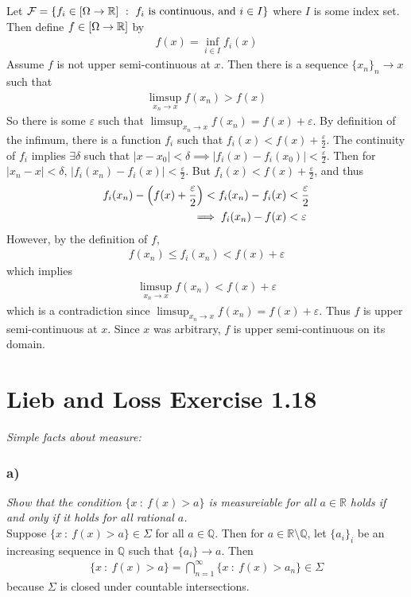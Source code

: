 \documentclass[12pt]{article}
\newcommand{\E}{\varepsilon}
\theoremstyle{plain}
\begin{document}
Let $\mathcal{F} = \{f_i \in \qty[\Omega \rightarrow \mathbb{R}]\ :\ f_i \text{ is continuous, and } i \in I\}$ where $I$ is some index set.  Then define $f \in \qty[\Omega \rightarrow \mathbb{R}]$ by
\begin{align*}
    f(x) = \inf_{i \in I}f_i(x)
\end{align*}
Assume $f$ is not upper semi-continuous at $x$.  Then there is a sequence $\{x_n\}_n \rightarrow x$ such that
\begin{align*}
    \limsup_{x_n \rightarrow x} f(x_n) > f(x)
\end{align*}
So there is some $\E$ such that $\limsup_{x_n \rightarrow x}f(x_n) = f(x) + \E$.  By definition of the infimum, there is a function $f_i$ such that $f_i(x) < f(x) + \frac{\E}{2}$.  The continuity of $f_i$ implies $\exists \delta$ such that $|x - x_0| < \delta \implies |f_i(x) - f_i(x_0)| < \frac{\E}{2}$.  Then for $|x_n - x| < \delta$, $|f_i(x_n) - f_i(x)| < \frac{\E}{2}$.  But $f_i(x) < f(x) + \frac{\E}{2}$, and thus
\begin{align*}
    f_i(x_n) - \qty(f(x) + \frac{\E}{2}) < f_i(x_n) - f_i(x) &< \frac{\E}{2} \\
    \implies f_i(x_n) - f(x) &< \E
\end{align*}
However, by the definition of $f$,
\begin{align*}
    f(x_n) \leq f_i(x_n) < f(x) + \E
\end{align*}
which implies
\begin{align*}
    \limsup_{x_n \rightarrow x}f(x_n) < f(x) + \E
\end{align*}
which is a contradiction since $\limsup_{x_n \rightarrow x}f(x_n) = f(x) + \E$.  Thus $f$ is upper semi-continuous at $x$.  Since $x$ was arbitrary, $f$ is upper semi-continuous on its domain.


\section*{Lieb and Loss Exercise 1.18}
\emph{Simple facts about measure:}

\subsubsection*{ a)}
\emph{Show that the condition $\{x\ :\ f(x) > a\}$ is measureiable for all $a \in \mathbb{R}$ holds if and only if it holds for all rational $a$.} \\

Suppose $\{x\ :\ f(x) > a\} \in \Sigma$ for all $a \in \mathbb{Q}$.  Then for $a \in \mathbb{R} \setminus \mathbb{Q}$, let $\{a_i\}_i$ be an increasing sequence in $\mathbb{Q}$ such that $\{a_i\} \rightarrow a$.  Then
\begin{align*}
    \{x\ :\ f(x) > a\} = \bigcap_{n=1}^\infty\{x\ :\ f(x) > a_n\} \in \Sigma
\end{align*}
because $\Sigma$ is closed under countable intersections.
\end{document}
